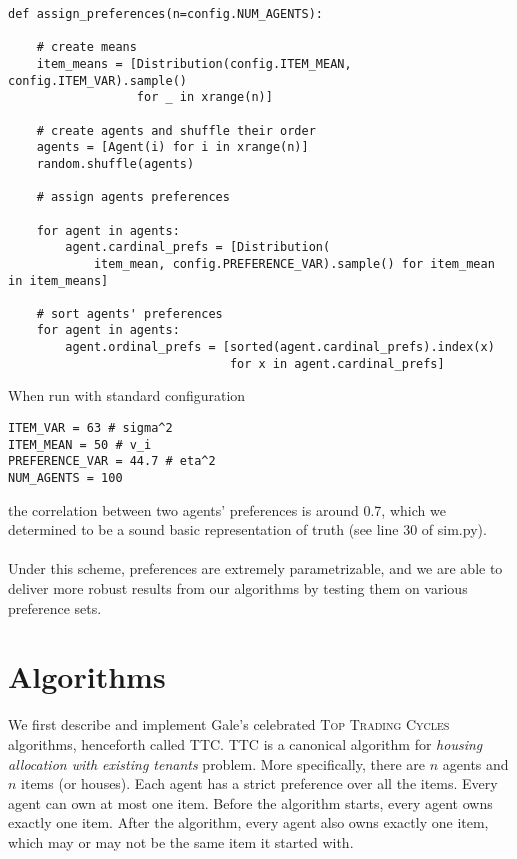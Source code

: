 \documentclass[12pt]{article}
\begin{document}
\begin{verbatim}
def assign_preferences(n=config.NUM_AGENTS):

    # create means
    item_means = [Distribution(config.ITEM_MEAN, config.ITEM_VAR).sample()
                  for _ in xrange(n)]

    # create agents and shuffle their order
    agents = [Agent(i) for i in xrange(n)]
    random.shuffle(agents)

    # assign agents preferences

    for agent in agents:
        agent.cardinal_prefs = [Distribution(
            item_mean, config.PREFERENCE_VAR).sample() for item_mean in item_means]

    # sort agents' preferences
    for agent in agents:
        agent.ordinal_prefs = [sorted(agent.cardinal_prefs).index(x)
                               for x in agent.cardinal_prefs]
\end{verbatim}

\noindent When run with standard configuration
\begin{verbatim}
ITEM_VAR = 63 # sigma^2
ITEM_MEAN = 50 # v_i
PREFERENCE_VAR = 44.7 # eta^2
NUM_AGENTS = 100
\end{verbatim}
\noindent the correlation between two agents' preferences is around 0.7, which we determined to be a sound basic representation of truth (see line 30 of sim.py).
\\\\Under this scheme, preferences are extremely parametrizable, and we are able to deliver more robust results from our algorithms by testing them on various preference sets.

\section*{Algorithms}

We first describe and implement Gale's celebrated \textsc{Top Trading Cycles} algorithms, henceforth called TTC. TTC is a canonical algorithm for \textit{housing allocation with existing tenants} problem. More specifically, there are $n$ agents and $n$ items (or houses). Each agent has a strict preference over all the items. Every agent can own at most one item. Before the algorithm starts, every agent owns exactly one item. After the algorithm, every agent also owns exactly one item, which may or may not be the same item it started with. 
\end{document}
